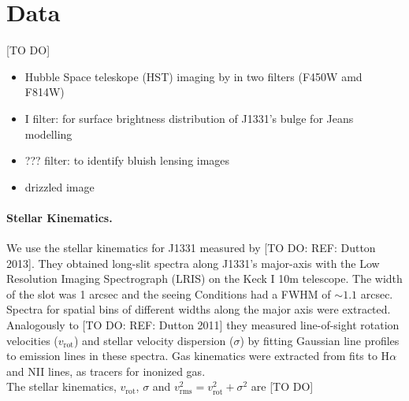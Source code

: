 \section{Data} \label{sec:data}

[TO DO]

\begin{itemize}
\item Hubble Space teleskope (HST) imaging by \cite{SWELLSI} in two filters (F450W amd F814W)
\item I filter: for surface brightness distribution of J1331's bulge for Jeans modelling
\item ??? filter: to identify bluish lensing images
\item drizzled image
\end{itemize}

\paragraph{Stellar Kinematics.} We use the stellar kinematics for J1331 measured by [TO DO: REF: Dutton 2013]. They obtained long-slit spectra along J1331's major-axis with the Low Resolution Imaging Spectrograph (LRIS) on the Keck I 10m telescope. The width of the slot was 1 arcsec and the seeing Conditions had a FWHM of $\sim 1.1$ arcsec. Spectra for spatial bins of different widths along the major axis were extracted. Analogously to [TO DO: REF: Dutton 2011] they measured line-of-sight rotation velocities ($v_\text{rot}$) and stellar velocity dispersion ($\sigma$) by fitting Gaussian line profiles to emission lines in these spectra. Gas kinematics were extracted from fits to H$\alpha$ and NII lines, as tracers for inonized gas.
\\The stellar kinematics, $v_\text{rot}$, $\sigma$ and $v_\text{rms}^2=v_\text{rot}^2 + \sigma^2$ are [TO DO]
